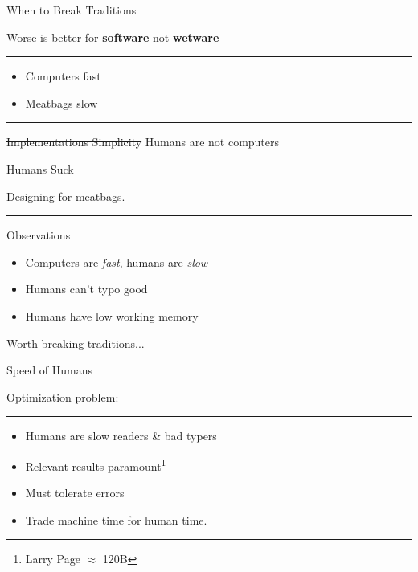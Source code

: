 \documentclass{beamer}
\begin{document}
\begin{frame}{When to Break Traditions}

	Worse is better for \textbf{software} not \textbf{wetware}

	\rule{\textwidth}{0.1em}

	\begin{itemize}

		\item Computers fast

		\item Meatbags slow

	\end{itemize}

	\rule{\textwidth}{0.1em}

	\st{Implementations Simplicity} Humans are not computers

\end{frame}


\begin{frame}{Humans Suck}

	Designing for meatbags.

	\rule{\textwidth}{0.1em}

	\begin{block}{Observations}

		\begin{itemize}

			\item Computers are \textit{fast}, humans are \textit{slow}

			\item Humans can't typo good

			\item Humans have low working memory

		\end{itemize}

	\end{block}

	Worth breaking traditions...

\end{frame}


\begin{frame}{Speed of Humans}

	Optimization problem:

	\rule{\textwidth}{0.1em}

	\begin{itemize}

		\item Humans are slow readers \& bad typers

		\item Relevant results paramount\footnote{Larry Page $\approx$ 120B}

		\item Must tolerate errors

		\item Trade machine time for human time.

	\end{itemize}

\end{frame}
\end{document}
